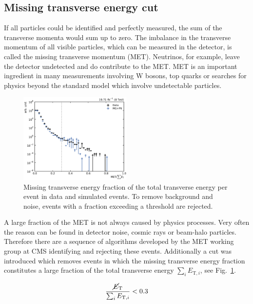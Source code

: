 \subsection{Missing transverse energy cut}

If all particles could be identified and perfectly measured, the sum of the
transverse momenta would sum up to zero. The imbalance in the transverse
momentum of all visible particles, which can be measured in the detector, is
called the missing transverse momentum (MET). Neutrinos, for example, leave the
detector undetected and do contribute to the MET. MET is an important ingredient
in many measurements involving W bosons, top quarks or searches for physics
beyond the standard model which involve undetectable particles. 

\begin{figure}[htbp]
    \centering
    \includegraphics[width=0.5\textwidth]{figures/measurement/metoversumet.pdf}
    \caption[Missing transverse energy distribution]{Missing transverse energy
    fraction of the total transverse energy per event in data and simulated
    events. To remove background and noise, events with a fraction exceeding a
    threshold are rejected. }
    \label{fig:mc:met_fraction}
\end{figure}

A large fraction of the MET is not always caused by physics processes. Very
often the reason can be found in detector noise, cosmic rays or beam-halo
particles. Therefore there are a sequence of algorithms developed by the MET
working group at CMS identifying and rejecting these events. Additionally a cut
was introduced which removes events in which the missing transverse energy
fraction \met constitutes a large fraction of the total transverse energy $\sum_i
E_{\mathrm{T},i}$, see Fig.~\ref{fig:mc:met_fraction}.

\begin{equation}
    \frac{\cancel{E}_{\mathrm{T}}}{\sum_i E_{\mathrm{T},i}} < 0.3
\end{equation}


